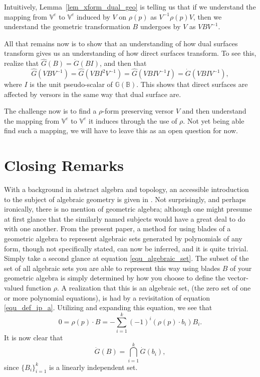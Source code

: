 \documentclass{birkjour}
\theoremstyle{definition}
\theoremstyle{remark}
\numberwithin{equation}{section}
\newcommand{\G}{\mathbb{G}}
\newcommand{\V}{\mathbb{V}}
\newcommand{\B}{\mathbb{B}}
\newcommand{\Gi}{\dot{G}}
\newcommand{\Go}{\hat{G}}
\begin{document}
Intuitively, Lemma~\ref{lem_xform_dual_geo} is telling us that if
we understand the mapping from $\V^e$ to $\V^e$ induced by $V$ on $\rho(p)$ as $V^{-1}\rho(p)V$,
then we understand the geometric transformation $B$ undergoes by $V$ as $VBV^{-1}$.

All that remains now is to show that an understanding of how dual surfaces
transform gives us an understanding of how direct surfaces transform.
To see this, realize that $\Go(B)=\Gi(BI)$, and then that
\begin{equation}
\Go(VBV^{-1})=\Go(VBI^2V^{-1})=\Go(VBIV^{-1}I)=\Gi(VBIV^{-1}),
\end{equation}
where $I$ is the unit pseudo-scalar of $\G(\B)$.  This shows that
direct surfaces are affected by versors in the same way that dual surface are.

The challenge now is to find a $\rho$-form preserving versor $V$ and then
understand the mapping from $\V^e$ to $\V^e$ it induces through
the use of $\rho$.  Not yet being able find such a mapping, we will have to leave this as
an open question for now.

\section{Closing Remarks}

With a background in abstract algebra and topology, an accessible
introduction to the subject of algebraic geometry is given in \cite{Milne12}.
Not surprisingly, and perhaps ironically, there is no mention of geometric algebra; although
one might presume at first glance that the similarly named subjects would have a great deal to do
with one another.  From the present paper, a method for using blades of a geometric
algebra to represent algebraic sets generated by polynomials of any form, though not specifically stated, can now be inferred, and it is quite trivial.  Simply take a second glance at
equation \eqref{equ_algebraic_set}.  The subset of the set of all algebraic sets
you are able to represent this way using blades $B$ of your geometric algebra is
simply determined by how you choose to define the vector-valued function $\rho$.
A realization that this is an algebraic set, (the zero set of one or more polynomial equations),
is had by a revisitation of equation \eqref{equ_def_ip_a}.  Utilizing and expanding
this equation, we see that
\begin{equation}\label{equ_rho_dot_B}
0 = \rho(p)\cdot B = -\sum_{i=1}^k (-1)^i(\rho(p)\cdot b_i)B_i.
\end{equation}
It is now clear that
\begin{equation}
\Gi(B) = \bigcap_{i=1}^k \Gi(b_i),
\end{equation}
since $\{B_i\}_{i=1}^k$ is a linearly independent set.
\end{document}
